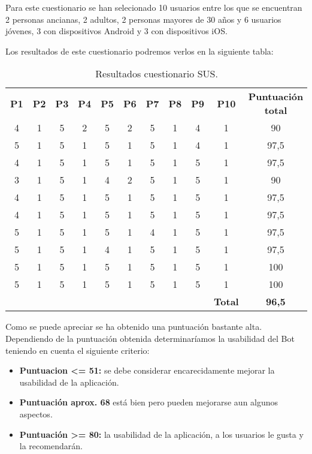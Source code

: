 Para este cuestionario se han selecionado 10 usuarios entre los que se encuentran 2 personas ancianas, 2 adultos, 2 personas mayores de 30 años y 6 usuarios jóvenes, 3 con dispositivos Android y 3 con dispositivos iOS.

Los resultados de este cuestionario podremos verlos en la siguiente tabla:

\begin{table}[H]
	\begin{center}
		\begin{tabular}{| c | c | c | c | c | c | c | c | c | c | c |}
			\hline
			
			\textbf{P1} & \textbf{P2} & \textbf{P3} & \textbf{P4} & \textbf{P5} & \textbf{P6} & \textbf{P7} & \textbf{P8} & \textbf{P9} & \textbf{P10} & \textbf{Puntuación total} \\
			4 & 1 & 5 & 2 & 5 & 2 & 5 & 1 & 4 & 1 & 90\\
			5 & 1 & 5 & 1 & 5 & 1 & 5 & 1 & 4 & 1 & 97,5\\
			4 & 1 & 5 & 1 & 5 & 1 & 5 & 1 & 5 & 1 & 97,5\\
			3 & 1 & 5 & 1 & 4 & 2 & 5 & 1 & 5 & 1 & 90\\
			4 & 1 & 5 & 1 & 5 & 1 & 5 & 1 & 5 & 1 & 97,5\\
			4 & 1 & 5 & 1 & 5 & 1 & 5 & 1 & 5 & 1 & 97,5\\
			5 & 1 & 5 & 1 & 5 & 1 & 4 & 1 & 5 & 1 & 97,5\\
			5 & 1 & 5 & 1 & 4 & 1 & 5 & 1 & 5 & 1 & 97,5\\
			5 & 1 & 5 & 1 & 5 & 1 & 5 & 1 & 5 & 1 & 100\\
			5 & 1 & 5 & 1 & 5 & 1 & 5 & 1 & 5 & 1 & 100\\
			 &  &  &  &  &  &  &  &  & \textbf{Total} & \textbf{96,5}\\ \hline
		\end{tabular}
		\caption{Resultados cuestionario SUS.}
	\end{center}
\end{table}

Como se puede apreciar se ha obtenido una puntuación bastante alta. Dependiendo de la puntuación obtenida determinaríamos la usabilidad del Bot teniendo en cuenta el siguiente criterio:

\begin{itemize}
	\item \textbf{Puntuacion <= 51:} se debe considerar encarecidamente mejorar la usabilidad de la aplicación.
	\item \textbf{Puntuación aprox. 68} está bien pero pueden mejorarse aun algunos aspectos.
	\item \textbf{Puntuación >= 80:} la usabilidad de la aplicación, a los usuarios le gusta y la recomendarán.
\end{itemize}

